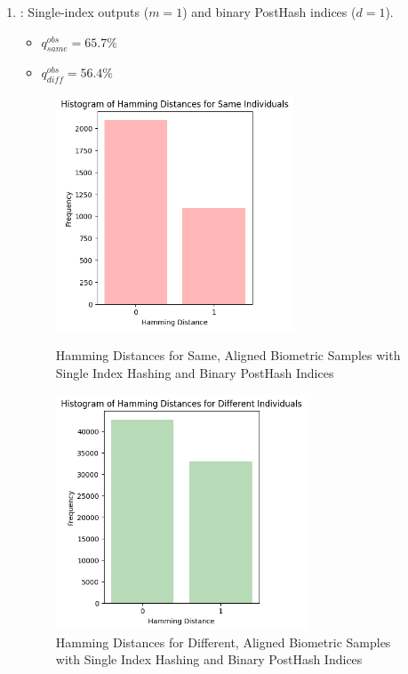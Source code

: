 \begin{enumerate}
    \item {}: Single-index outputs (\(m=1\)) and binary PostHash indices (\(d=1\)).
    \begin{itemize}
        \item \(q_{same}^{obs} = 65.7\%\)
        \item \(q_{diff}^{obs} = 56.4\%\)
    \end{itemize}

    \begin{figure}[H]
        \centering
        \begin{minipage}[b]{0.48\linewidth}
            \centering
            \includegraphics[width=\linewidth,height=7cm,keepaspectratio]{latex-img/d1same.png}
            \caption{Hamming Distances for Same, Aligned Biometric Samples with Single Index Hashing and Binary PostHash Indices}
            \label{mu_same}
        \end{minipage}
        \hfill
        \begin{minipage}[b]{0.48\linewidth}
            \centering
            \includegraphics[width=\linewidth,height=7cm,keepaspectratio]{latex-img/d1diff.png}
            \caption{Hamming Distances for Different, Aligned Biometric Samples with Single Index Hashing and Binary PostHash Indices}
            \label{mu_diff}
        \end{minipage}
    \end{figure}
    

\end{enumerate}
